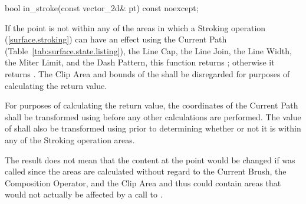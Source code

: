 \begin{itemdecl}
bool in_stroke(const vector_2d& pt) const noexcept;
\end{itemdecl}
\begin{itemdescr}
\pnum
\returns
If the point  is not within any of the areas in which a Stroking operation (\ref{surface.stroking}) can have an effect using the Current Path (Table~\ref{tab:surface.state.listing}), the Line Cap, the Line Join, the Line Width, the Miter Limit, and the Dash Pattern, this function returns ; otherwise it returns . The Clip Area and bounds of the \underlyingsurface shall be disregarded for purposes of calculating the return value.

\pnum
For purposes of calculating the return value, the coordinates of the Current Path shall be transformed using  before any other calculations are performed. The value of  shall also be transformed using  prior to determining whether or not it is within any of the Stroking operation areas.

\pnum
\realnotes
The result does not mean that the content at the point  would be changed if  was called since the areas are calculated without regard to the Current Brush, the Composition Operator, and the Clip Area and thus could contain areas that would not actually be affected by a call to .
\end{itemdescr}

